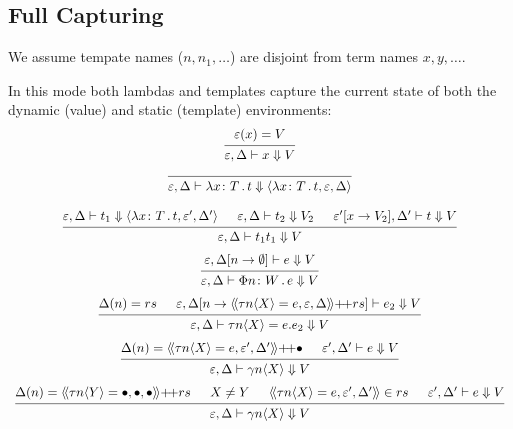 \documentclass{article}
\newcommand{\la}{\langle}
\newcommand{\ra}{\rangle}
\newcommand{\lda}{\langle\!\langle}
\newcommand{\rda}{\rangle\!\rangle}
\newcommand{\ve}{\varepsilon}
\newcommand{\de}{\Delta}
\newcommand{\hole}{\bullet}
\newcommand{\st}{\,.\,}
\newcommand{\cl}{{\colon}}
\newcommand{\pp}{{+}\!{+}}
\newcommand{\da}{\Downarrow}
\newcommand{\vd}{\vdash}
\begin{document}
\subsection{Full Capturing}

We assume tempate names ($n,n_1,\dots$) are disjoint from term names $x,y,\dots$.

In this mode both lambdas and templates capture the current state of both the dynamic (value) and static (template) environments:
\begin{displaymath}
  \begin{array}{c}
    \begin{prooftree}
      \hypo{\ve(x) = V}
      \infer1{\ve,\de \vd x \da V}
    \end{prooftree}
    \\[15pt]
    \begin{prooftree}
      \infer0{\ve ,\de \vd \lambda x\cl T\st t \da \la \lambda x\cl T\st t , \ve, \de \ra}
    \end{prooftree}
    \\[15pt]
    \begin{prooftree}
      \hypo{\ve,\de \vd t_1 \da \la \lambda x \cl T\st t, \ve', \de' \ra}
      \hypo{\ve,\de \vd t_2 \da V_2}
      \hypo{\ve'[x \to V_2],\de' \vd t \da V}
      \infer3{\ve,\de \vd t_1t_1 \da V}
    \end{prooftree}
    \\[15pt]
    \begin{prooftree}
      \hypo{\ve,\de[n \to \emptyset] \vd e \da V}
      \infer1{\ve,\de \vd \Phi n \cl W \st e \da V}
    \end{prooftree}
    \\[15pt]
    \begin{prooftree}
      \hypo{\de(n) = rs}
      \hypo{\ve,\de[n \to \lda \tau n\la X\ra = e , \ve, \de \rda \pp rs] \vd e_2 \da V}
      \infer2{\ve,\de \vd \tau n\la X\ra = e . e_2 \da V}
    \end{prooftree}
    \\[15pt]
    \begin{prooftree}
      \hypo{\de(n) = \lda \tau n\la X\ra = e , \ve', \de' \rda \pp \hole}
      \hypo{\ve',\de' \vd e \da V}
      \infer2{\ve,\de\vd \gamma n \la X \ra \da V}
    \end{prooftree}
    \\[15pt]
    \begin{prooftree}
      \hypo{\de(n) = \lda \tau n\la Y\ra = \hole , \hole, \hole \rda \pp rs}
      \hypo{X \neq Y}
      \hypo{\lda \tau n\la X\ra = e , \ve', \de' \rda \in rs}
      \hypo{\ve',\de' \vd e \da V}
      \infer4{\ve,\de\vd \gamma n \la X \ra \da V}
    \end{prooftree}
  \end{array}
\end{displaymath}
\end{document}
